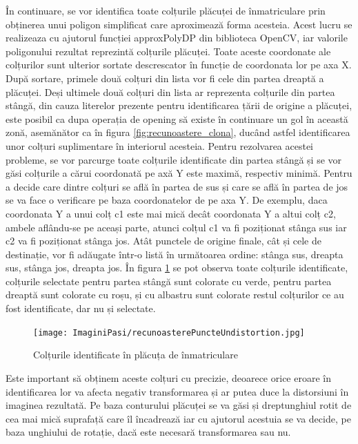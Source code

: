 \documentclass[12pt]{article}
\begin{document}
\^{I}n continuare, se vor identifica toate colțurile pl\u{a}cuței de \^{i}nmatriculare prin obținerea unui poligon simplificat care aproximeaz\u{a} forma acesteia. Acest lucru se realizeaza cu ajutorul funcției approxPolyDP din biblioteca OpenCV, iar valorile poligonului rezultat reprezint\u{a} colțurile pl\u{a}cuței. Toate aceste coordonate ale colțurilor sunt ulterior sortate descrescator \^{i}n funcție de coordonata lor pe axa X. Dup\u{a} sortare, primele dou\u{a} colțuri din lista vor fi cele din partea dreapt\u{a} a pl\u{a}cuței. Deși ultimele dou\u{a} colțuri din lista ar reprezenta colțurile din partea st\^{a}ng\u{a}, din cauza literelor prezente pentru identificarea ț\u{a}rii de origine a pl\u{a}cuței, este posibil ca dupa operația de opening s\u{a} existe \^{i}n continuare un gol \^{i}n aceast\u{a} zon\u{a}, asem\u{a}n\u{a}tor ca \^{i}n figura \ref{fig:recunoastere_clona}, duc\^{a}nd astfel identificarea unor colțuri suplimentare \^{i}n interiorul acesteia. Pentru rezolvarea acestei probleme, se vor parcurge toate colțurile identificate din partea st\^{a}ng\u{a} și se vor g\u{a}si colțurile a c\u{a}rui coordonat\u{a} pe ax\u{a} Y este maxim\u{a}, respectiv minim\u{a}. Pentru a decide care dintre colțuri se afl\u{a} \^{i}n partea de sus și care se afl\u{a} \^{i}n partea de jos se va face o verificare pe baza coordonatelor de pe axa Y. De exemplu, daca coordonata Y a unui colț c1 este mai mic\u{a} dec\^{a}t coordonata Y a altui colț c2, ambele afl\^{a}ndu-se pe aceași parte, atunci colțul c1 va fi poziționat st\^{a}nga sus iar c2 va fi poziționat st\^{a}nga jos. At\^{a}t punctele de origine finale, c\^{a}t și cele de destinație, vor fi ad\u{a}ugate \^{i}ntr-o list\u{a} \^{i}n urm\u{a}toarea ordine: st\^{a}nga sus, dreapta sus, st\^{a}nga jos, dreapta jos. \^{I}n figura \ref{fig:recunoastere_puncte} se pot observa toate colțurile identificate, colțurile selectate pentru partea st\^{a}ng\u{a} sunt colorate cu verde, pentru partea dreapt\u{a} sunt colorate cu roșu, și cu albastru sunt colorate restul colțurilor ce au fost identificate, dar nu și selectate.

\begin{figure}[H]
  \centering
  \texttt{[image: ImaginiPasi/recunoasterePuncteUndistortion.jpg]}
  \caption{Colțurile identificate \^{i}n pl\u{a}cuța de \^{i}nmatriculare}
  \label{fig:recunoastere_puncte}
\end{figure}

Este important s\u{a} obținem aceste colțuri cu precizie, deoarece orice eroare \^{i}n identificarea lor va afecta negativ transformarea și ar putea duce la distorsiuni \^{i}n imaginea rezultată. Pe baza conturului pl\u{a}cuței se va g\u{a}si și dreptunghiul rotit de cea mai mic\u{a} suprafaț\u{a} care \^{i}l \^{i}ncadreaz\u{a} iar cu ajutorul acestuia se va decide, pe baza unghiului de rotație, dac\u{a} este necesar\u{a} transformarea sau nu.
\end{document}
